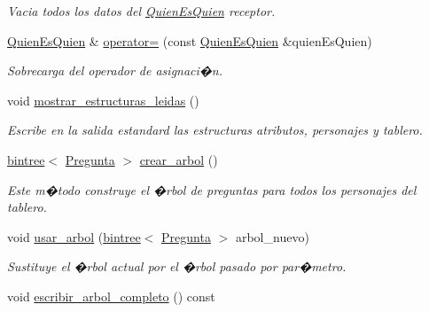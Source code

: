 \begin{DoxyCompactItemize}
\begin{DoxyCompactList}\small\item\em Vacia todos los datos del \hyperlink{classQuienEsQuien}{Quien\+Es\+Quien} receptor. \end{DoxyCompactList}\item 
\hyperlink{classQuienEsQuien}{Quien\+Es\+Quien} \& \hyperlink{classQuienEsQuien_ae7a4139787934cca03996687460935dd}{operator=} (const \hyperlink{classQuienEsQuien}{Quien\+Es\+Quien} \&quien\+Es\+Quien)
\begin{DoxyCompactList}\small\item\em Sobrecarga del operador de asignaci�n. \end{DoxyCompactList}\item 
void \hyperlink{classQuienEsQuien_a67a107f9ffee5bf65cc0884fa39d66cf}{mostrar\+\_\+estructuras\+\_\+leidas} ()\hypertarget{classQuienEsQuien_a67a107f9ffee5bf65cc0884fa39d66cf}{}\label{classQuienEsQuien_a67a107f9ffee5bf65cc0884fa39d66cf}

\begin{DoxyCompactList}\small\item\em Escribe en la salida estandard las estructuras atributos, personajes y tablero. \end{DoxyCompactList}\item 
\hyperlink{classbintree}{bintree}$<$ \hyperlink{classPregunta}{Pregunta} $>$ \hyperlink{classQuienEsQuien_a2af507d54ac1d74f98ee5694fccf0406}{crear\+\_\+arbol} ()\hypertarget{classQuienEsQuien_a2af507d54ac1d74f98ee5694fccf0406}{}\label{classQuienEsQuien_a2af507d54ac1d74f98ee5694fccf0406}

\begin{DoxyCompactList}\small\item\em Este m�todo construye el �rbol de preguntas para todos los personajes del tablero. \end{DoxyCompactList}\item 
void \hyperlink{classQuienEsQuien_a0949bd026c2beeaacbf36fd0ba6fc3a9}{usar\+\_\+arbol} (\hyperlink{classbintree}{bintree}$<$ \hyperlink{classPregunta}{Pregunta} $>$ arbol\+\_\+nuevo)
\begin{DoxyCompactList}\small\item\em Sustituye el �rbol actual por el �rbol pasado por par�metro. \end{DoxyCompactList}\item 
void \hyperlink{classQuienEsQuien_a1b8c88bef5056bdd366810d180d29d94}{escribir\+\_\+arbol\+\_\+completo} () const \hypertarget{classQuienEsQuien_a1b8c88bef5056bdd366810d180d29d94}{}\label{classQuienEsQuien_a1b8c88bef5056bdd366810d180d29d94}


\end{DoxyCompactItemize}
